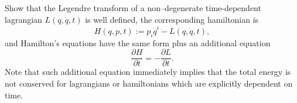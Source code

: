 \documentclass[english,fontsize=11pt,paper=a5,oneside]{scrbook}
\theoremstyle{definition}
\newenvironment{exercise}
  {\pushQED{\qed}\renewcommand{\qedsymbol}{$\maltese$}\exercisex}
  {\popQED\endexercisex}
\begin{document}
\begin{exercise}\label{exe:timedep}
  Show that the Legendre transform of a non--degenerate time-dependent lagrangian $L(q,\dot q, t)$ is well defined, the corresponding hamiltonian is
  \begin{equation}
    H(q,p,t) := p_i \dot q^i - L(q, \dot q, t),
  \end{equation}
  and Hamilton's equations have the same form plus an additional equation
  \begin{equation}
    \frac{\partial H}{\partial t} = - \frac{\partial L}{\partial t}.
  \end{equation}
  Note that such additional equation immediately implies that the total energy is not conserved for lagrangians or hamiltonians which are explicitly dependent on time.
\end{exercise}
\end{document}
